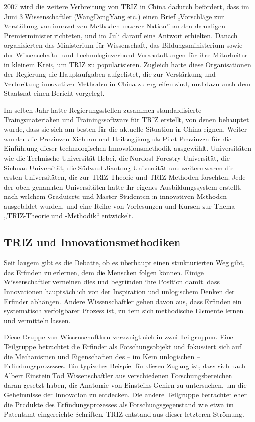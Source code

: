 \documentclass[11pt,a4paper]{article}
\begin{document}
2007 wird die weitere Verbreitung von TRIZ in China dadurch befördert, dass im
Juni 3 Wissenschaftler (WangDongYang etc.) einen Brief „Vorschläge zur
Verstäkung von innovativen Methoden unserer Nation” an den damaligen
Premierminister richteten, und im Juli darauf eine Antwort erhielten. Danach
organisierten das Ministerium für Wissenschaft, das Bildungsministerium sowie
der Wissenschafts- und Technologieverband Veranstaltungen für ihre Mitarbeiter
in kleinem Kreis, um TRIZ zu popularisieren. Zugleich hatte diese
Organisationen der Regierung die Hauptaufgaben aufgelistet, die zur
Verstärkung und Verbreitung innovativer Methoden in China zu ergreifen sind,
und dazu auch dem Staatsrat einen Bericht vorgelegt.

Im selben Jahr hatte Regierungsstellen zusammen standardisierte
Traingsmaterialien und Trainingssoftware für TRIZ erstellt, von denen
behauptet wurde, dass sie sich am besten für die aktuelle Situation in China
eignen. Weiter wurden die Provinzen Xichuan und Heilongjiang als
Pilot-Provinzen für die Einführung dieser technologischen Innovationsmethodik
ausgewählt. Universitäten wie die Technische Universität Hebei, die Nordost
Forestry Universität, die Sichuan Universität, die Südwest Jiaotong
Universität uns weitere waren die ersten Universitäten, die zur TRIZ-Theorie
und TRIZ-Methoden forschten. Jede der oben genannten Universitäten hatte ihr
eigenes Ausbildungssystem erstellt, nach welchem Graduierte und
Master-Studenten in innovativen Methoden ausgebildet wurden, und eine Reihe von
Vorlesungen und Kursen zur Thema „TRIZ-Theorie und -Methodik“ entwickelt.

\subsection{TRIZ und Innovationsmethodiken}

Seit langem gibt es die Debatte, ob es überhaupt einen strukturierten Weg
gibt, das Erfinden zu erlernen, dem die Menschen folgen können.  Einige
Wissenschaftler verneinen dies und begründen ihre Position damit, dass
Innovationen hauptsächlich von der Inspiration und unlogischem Denken der
Erfinder abhängen.  Andere Wissenschaftler gehen davon aus, dass Erfinden ein
systematisch verfolgbarer Prozess ist, zu dem sich methodische Elemente lernen
und vermitteln lassen.

Diese Gruppe von Wissenschaftlern verzweigt sich in zwei Teilgruppen. Eine
Teilgruppe betrachtet die Erfinder als Forschungsobjekt und fokussiert sich
auf die Mechanismen und Eigenschaften des -- im Kern unlogischen --
Erfindungsprozesses.  Ein typisches Beispiel für diesen Zugang ist, dass sich
nach Albert Einstein Tod Wissenschaftler aus verschiedenen Forschungsbereichen
daran gesetzt haben, die Anatomie von Einsteins Gehirn zu untersuchen, um die
Geheimnisse der Innovation zu entdecken. Die andere Teilgruppe betrachtet eher
die Produkte des Erfindungsprozesses als Forschungsgegenstand wie etwa im
Patentamt eingereichte Schriften. TRIZ entstand aus dieser letzteren
Strömung. 
\end{document}
